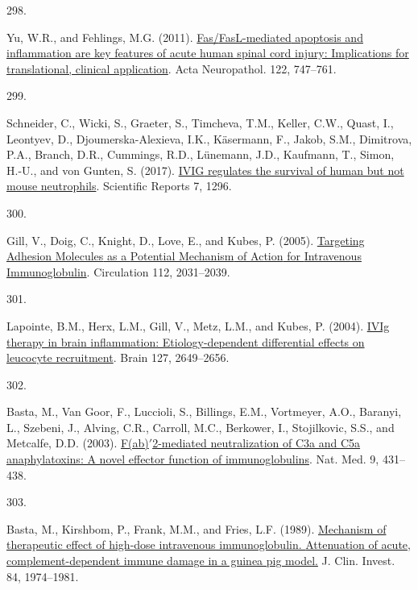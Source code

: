 \documentclass[
]{article}
\newlength{\cslhangindent}
\newlength{\csllabelwidth}
\newlength{\cslentryspacingunit} %
\newenvironment{CSLReferences}[2] %
 {%
  \setlength{\parindent}{0pt}
  \ifodd #1
  \let\oldpar\par
  \def\par{\hangindent=\cslhangindent\oldpar}
  \fi
  \setlength{\parskip}{#2\cslentryspacingunit}
 }%
 {}
\newcommand{\CSLLeftMargin}[1]{\parbox[t]{\csllabelwidth}{#1}}
\newcommand{\CSLRightInline}[1]{\parbox[t]{\linewidth - \csllabelwidth}{#1}\break}
\begin{document}
\begin{CSLReferences}{0}{0}
\leavevmode{}%
\CSLLeftMargin{298. }
\CSLRightInline{Yu, W.R., and Fehlings, M.G. (2011). \href{https://doi.org/10.1007/s00401-011-0882-3}{Fas/{FasL-mediated} apoptosis and inflammation are key features of acute human spinal cord injury: Implications for translational, clinical application}. Acta Neuropathol. 122, 747--761.}

\leavevmode{}%
\CSLLeftMargin{299. }
\CSLRightInline{Schneider, C., Wicki, S., Graeter, S., Timcheva, T.M., Keller, C.W., Quast, I., Leontyev, D., Djoumerska-Alexieva, I.K., Käsermann, F., Jakob, S.M., Dimitrova, P.A., Branch, D.R., Cummings, R.D., Lünemann, J.D., Kaufmann, T., Simon, H.-U., and von Gunten, S. (2017). \href{https://doi.org/10.1038/s41598-017-01404-0}{{IVIG} regulates the survival of human but not mouse neutrophils}. Scientific Reports 7, 1296.}

\leavevmode{}%
\CSLLeftMargin{300. }
\CSLRightInline{Gill, V., Doig, C., Knight, D., Love, E., and Kubes, P. (2005). \href{https://doi.org/10.1161/CIRCULATIONAHA.105.546150}{Targeting {Adhesion Molecules} as a {Potential Mechanism} of {Action} for {Intravenous Immunoglobulin}}. Circulation 112, 2031--2039.}

\leavevmode{}%
\CSLLeftMargin{301. }
\CSLRightInline{Lapointe, B.M., Herx, L.M., Gill, V., Metz, L.M., and Kubes, P. (2004). \href{https://doi.org/10.1093/brain/awh297}{{IVIg} therapy in brain inflammation: Etiology-dependent differential effects on leucocyte recruitment}. Brain 127, 2649--2656.}

\leavevmode{}%
\CSLLeftMargin{302. }
\CSLRightInline{Basta, M., Van Goor, F., Luccioli, S., Billings, E.M., Vortmeyer, A.O., Baranyi, L., Szebeni, J., Alving, C.R., Carroll, M.C., Berkower, I., Stojilkovic, S.S., and Metcalfe, D.D. (2003). \href{https://doi.org/10.1038/nm836}{F(ab){\({'}\)}2-mediated neutralization of {C3a} and {C5a} anaphylatoxins: A novel effector function of immunoglobulins}. Nat. Med. 9, 431--438.}

\leavevmode{}%
\CSLLeftMargin{303. }
\CSLRightInline{Basta, M., Kirshbom, P., Frank, M.M., and Fries, L.F. (1989). \href{https://doi.org/10.1172/JCI114387}{Mechanism of therapeutic effect of high-dose intravenous immunoglobulin. {Attenuation} of acute, complement-dependent immune damage in a guinea pig model.} J. Clin. Invest. 84, 1974--1981.}


\end{CSLReferences}
\end{document}
